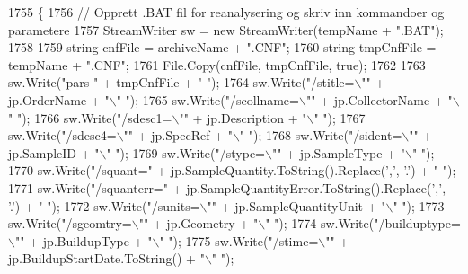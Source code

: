 \begin{DoxyCode}
1755         \{
1756             \textcolor{comment}{// Opprett .BAT fil for reanalysering og skriv inn kommandoer og parametere}
1757             StreamWriter sw = \textcolor{keyword}{new} StreamWriter(tempName + \textcolor{stringliteral}{".BAT"});
1758             
1759             \textcolor{keywordtype}{string} cnfFile = archiveName + \textcolor{stringliteral}{".CNF"};
1760             \textcolor{keywordtype}{string} tmpCnfFile = tempName + \textcolor{stringliteral}{".CNF"};
1761             File.Copy(cnfFile, tmpCnfFile, \textcolor{keyword}{true});
1762 
1763             sw.Write(\textcolor{stringliteral}{"pars "} + tmpCnfFile + \textcolor{stringliteral}{" "});
1764             sw.Write(\textcolor{stringliteral}{"/stitle=\(\backslash\)""} + jp.OrderName + \textcolor{stringliteral}{"\(\backslash\)" "});
1765             sw.Write(\textcolor{stringliteral}{"/scollname=\(\backslash\)""} + jp.CollectorName + \textcolor{stringliteral}{"\(\backslash\)" "});
1766             sw.Write(\textcolor{stringliteral}{"/sdesc1=\(\backslash\)""} + jp.Description + \textcolor{stringliteral}{"\(\backslash\)" "});
1767             sw.Write(\textcolor{stringliteral}{"/sdesc4=\(\backslash\)""} + jp.SpecRef + \textcolor{stringliteral}{"\(\backslash\)" "});
1768             sw.Write(\textcolor{stringliteral}{"/sident=\(\backslash\)""} + jp.SampleID + \textcolor{stringliteral}{"\(\backslash\)" "});
1769             sw.Write(\textcolor{stringliteral}{"/stype=\(\backslash\)""} + jp.SampleType + \textcolor{stringliteral}{"\(\backslash\)" "});
1770             sw.Write(\textcolor{stringliteral}{"/squant="} + jp.SampleQuantity.ToString().Replace(\textcolor{charliteral}{','}, \textcolor{charliteral}{'.'}) + \textcolor{stringliteral}{" "});
1771             sw.Write(\textcolor{stringliteral}{"/squanterr="} + jp.SampleQuantityError.ToString().Replace(\textcolor{charliteral}{','}, \textcolor{charliteral}{'.'}) + \textcolor{stringliteral}{" "});
1772             sw.Write(\textcolor{stringliteral}{"/sunits=\(\backslash\)""} + jp.SampleQuantityUnit + \textcolor{stringliteral}{"\(\backslash\)" "});
1773             sw.Write(\textcolor{stringliteral}{"/sgeomtry=\(\backslash\)""} + jp.Geometry + \textcolor{stringliteral}{"\(\backslash\)" "});
1774             sw.Write(\textcolor{stringliteral}{"/builduptype=\(\backslash\)""} + jp.BuildupType + \textcolor{stringliteral}{"\(\backslash\)" "});
1775             sw.Write(\textcolor{stringliteral}{"/stime=\(\backslash\)""} + jp.BuildupStartDate.ToString() + \textcolor{stringliteral}{"\(\backslash\)" "});

\end{DoxyCode}

